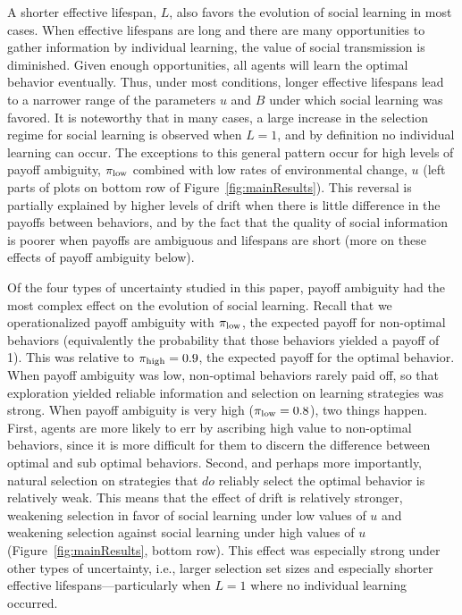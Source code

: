 \documentclass[letterpaper,11.5pt]{scrartcl}
\newcommand{\cm}[1]{{\textcolor{mypurple} {({\tiny CM:} #1)}}}
\begin{document}
A shorter effective lifespan, $L$, also favors the evolution of social learning in most cases. When effective lifespans are long and there are many opportunities to gather information by individual learning, the value of social transmission is diminished. Given enough opportunities, all agents will learn the optimal behavior eventually. Thus, under most conditions, longer effective lifespans lead to a narrower range of the parameters $u$ and $B$ under which social learning was favored. It is noteworthy that in many cases, a large increase in the selection regime for social learning is observed when $L=1$, and by definition no individual learning can occur. The exceptions to this general pattern occur for high levels of payoff ambiguity, $\pi_{\mathrm{low}}$ combined with low rates of environmental change, $u$ (left parts of plots on bottom row of Figure~\ref{fig:mainResults}). This reversal is partially explained by higher levels of drift when there is little difference in the payoffs between behaviors, and by the fact that the quality of social information is poorer when payoffs are ambiguous and lifespans are short (more on these effects of payoff ambiguity below).  

Of the four types of uncertainty studied in this paper, payoff ambiguity had the most
complex effect on the evolution of social learning. Recall that we operationalized
payoff ambiguity with $\pi_{\mathrm{low}}$, the expected payoff for non-optimal behaviors
(equivalently the probability that those behaviors yielded a payoff of 1). This was
relative to $\pi_{\mathrm{high}} = 0.9$, the expected payoff for the optimal behavior. When
payoff ambiguity was low, non-optimal behaviors rarely paid off, so that exploration
yielded reliable information and selection on learning strategies was  strong. When
payoff ambiguity is very high ($\pi_{\mathrm{low}} = 0.8$), two things happen. First, agents are
more likely to err by ascribing high value to non-optimal behaviors, since it is
more difficult for them to discern the difference between optimal and sub optimal
behaviors. Second, and perhaps more importantly, natural selection on strategies
that $do$ reliably select the optimal behavior is relatively weak. This means that
the effect of drift is relatively stronger, weakening selection in favor of social
learning under low values of $u$ and weakening selection against social learning
under high values of $u$ (Figure~\ref{fig:mainResults}, bottom row). 
This effect was especially strong under other types of uncertainty, i.e., larger selection set sizes and especially shorter effective lifespans---particularly when $L=1$ where no individual learning occurred. 
\end{document}
